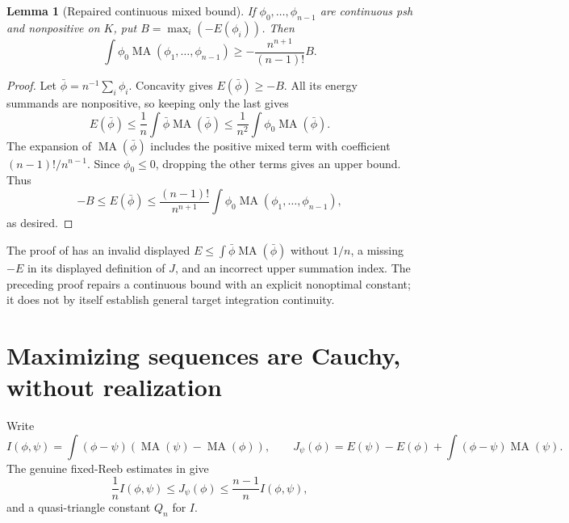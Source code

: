 \documentclass[11pt]{article}
\newcommand{\MA}{\operatorname{MA}}
\newtheorem{lemma}[proposition]{Lemma}
\theoremstyle{remark}
\begin{document}
\begin{lemma}[Repaired continuous mixed bound]
If $\phi_0,\ldots,\phi_{n-1}$ are continuous psh and nonpositive on $K$, put $B=\max_i(-E(\phi_i))$. Then
\[
 \int\phi_0\MA(\phi_1,\ldots,\phi_{n-1})
 \ge-\frac{n^{n+1}}{(n-1)!}B.
\]
\end{lemma}
\begin{proof}
Let $\bar\phi=n^{-1}\sum_i\phi_i$. Concavity gives $E(\bar\phi)\ge-B$. All its energy summands are nonpositive, so keeping only the last gives
\[
 E(\bar\phi)\le\frac1n\int\bar\phi\MA(\bar\phi)
       \le\frac1{n^2}\int\phi_0\MA(\bar\phi).
\]
The expansion of $\MA(\bar\phi)$ includes the positive mixed term with coefficient $(n-1)!/n^{n-1}$. Since $\phi_0\le0$, dropping the other terms gives an upper bound. Thus
\[
 -B\le E(\bar\phi)\le\frac{(n-1)!}{n^{n+1}}
          \int\phi_0\MA(\phi_1,\ldots,\phi_{n-1}),
\]
as desired.
\end{proof}
The proof of \cite[Lemma 6.4]{Wu24} has an invalid displayed $E\le\int\bar\phi\MA(\bar\phi)$ without $1/n$, a missing $-E$ in its displayed definition of $J$, and an incorrect upper summation index. The preceding proof repairs a continuous bound with an explicit nonoptimal constant; it does not by itself establish general target integration continuity.

\section{Maximizing sequences are Cauchy, without realization}
Write
\[
 I(\phi,\psi)=\int(\phi-\psi)(\MA(\psi)-\MA(\phi)),\qquad
 J_\psi(\phi)=E(\psi)-E(\phi)+\int(\phi-\psi)\MA(\psi).
\]
The genuine fixed-Reeb estimates in \cite{Wu24} give
\[
 \frac1n I(\phi,\psi)\le J_\psi(\phi)\le\frac{n-1}n I(\phi,\psi),
\]
and a quasi-triangle constant $Q_n$ for $I$.
\end{document}
